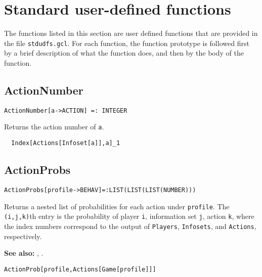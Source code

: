 %
%
%

\chapter{Standard user-defined functions}

The functions listed in this section are user defined functions that
are provided in the file \verb+stdudfs.gcl+.  For each function, the
function prototype is followed first by a brief description of what
the function does, and then by the body of the function.  


\section*{ActionNumber}\label{ExtActionNumber}
\begin{verbatim}
ActionNumber[a->ACTION] =: INTEGER 
\end{verbatim}

Returns the action number of \verb+a+.

\udfbody
\begin{verbatim}
  Index[Actions[Infoset[a]],a]_1
\end{verbatim} 


\section*{ActionProbs}\label{ExtActionProbs}
\begin{verbatim}
ActionProbs[profile->BEHAV]=:LIST(LIST(LIST(NUMBER)))
\end{verbatim}

Returns a nested list of probabilities for each action under
\verb+profile+.  The \verb+(i,j,k)+th entry is the probability of
player \verb+i+, information set \verb+j+, action \verb+k+, where the
index numbers correspond to the output of \verb+Players+, \verb+Infosets+,
and \verb+Actions+, respectively. 

\textbf{See also:}
,
.

\udfbody
\begin{verbatim}
ActionProb[profile,Actions[Game[profile]]]
\end{verbatim} 

